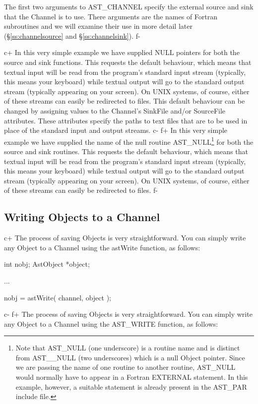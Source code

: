 \documentclass[twoside,11pt]{starlink}
\providecommand{\secref}[1]{\S\ref{#1}}
\begin{document}
{The first two arguments to AST\_CHANNEL specify the external source
and sink that the Channel is to use. There arguments are the names of
Fortran subroutines and we will examine their use in more detail later
(\secref{ss:channelsource} and \secref{ss:channelsink}).
f-

c+
In this very simple example we have supplied NULL pointers for both
the source and sink functions. This requests the default behaviour,
which means that textual input will be read from the program's
standard input stream (typically, this means your keyboard) while
textual output will go to the standard output stream (typically
appearing on your screen). On UNIX systems, of course, either of these
streams can easily be redirected to files. This default behaviour can be
changed by assigning values to the Channel's SinkFile and/or SourceFile
attributes. These attributes specify the paths to text files that are to
be used in place of the standard input and output streams.
c-
f+
In this very simple example we have supplied the name of the null
routine AST\_NULL\footnote{Note that AST\_NULL (one underscore) is a
routine name and is distinct from AST\_\_NULL (two underscores) which
is a null Object pointer.  Since we are passing the name of one
routine to another routine, AST\_NULL would normally have to appear in
a Fortran EXTERNAL statement. In this example, however, a suitable
statement is already present in the AST\_PAR include file.} for both
the source and sink routines.  This requests the default behaviour,
which means that textual input will be read from the program's
standard input stream (typically, this means your keyboard) while
textual output will go to the standard output stream (typically
appearing on your screen). On UNIX systems, of course, either of these
streams can easily be redirected to files.
f-

\subsection{\label{ss:writingtoachannel}Writing Objects to a Channel}

c+
The process of saving Objects is very straightforward. You can
simply write any Object to a Channel using the astWrite
function, as follows:

\small
\begin{terminalv}
int nobj;
AstObject *object;

...

nobj = astWrite( channel, object );
\end{terminalv}
\normalsize
c-
f+
The process of saving Objects is very straightforward. You can
simply write any Object to a Channel using the AST\_WRITE
function, as follows:

}
\end{document}
